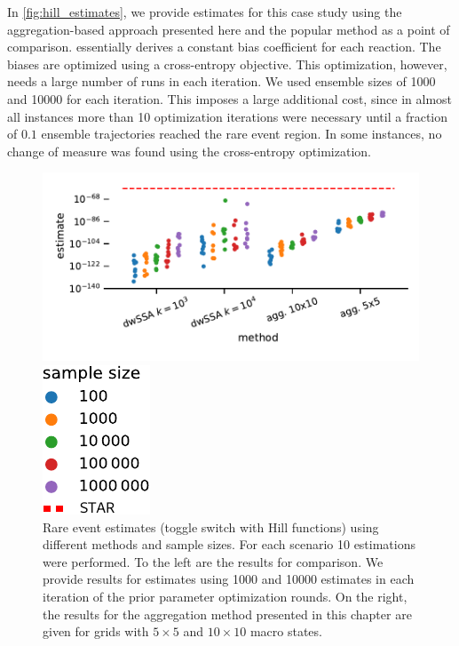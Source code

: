 In \autoref{fig:hill_estimates}, we provide estimates for this case
study using the aggregation-based approach presented here and the
popular  method as a point of comparison.
 \parencite{daigle2011automated} essentially derives a
constant bias coefficient for each reaction.
The biases are optimized using a cross-entropy objective.
This optimization, however, needs a large number of runs in each iteration.
We used ensemble sizes of \num{1000} and \num{10000} for each iteration.
This imposes a large additional cost, since in almost all instances
more than \num{10} optimization iterations were necessary until a
fraction of $0.1$ ensemble trajectories reached the rare event region.
In some instances, no change of measure was found using the
cross-entropy optimization.
\begin{figure}[htb]
  \centering
  \begin{minipage}{0.77\textwidth}
    \includegraphics[scale=.55]{gfx/hill_estimates.pdf}
  \end{minipage}
  \hspace{1ex}
  \begin{minipage}{0.07\textwidth}
    \includegraphics[scale=.55]{gfx/hill_estimates_legend.pdf}
  \end{minipage}
  \caption[Rare event estimates (toggle
  switch)]{\label{fig:hill_estimates}Rare event estimates (toggle
    switch with Hill functions) using different methods and sample
    sizes. For each scenario \num{10} estimations were performed. To
    the left are the  results for comparison. We provide
    results for estimates using \num{1000} and \num{10000} estimates in
    each iteration of the prior parameter optimization rounds. On the
    right, the results for the aggregation method presented in this
  chapter are given for grids with $5\times 5$ and $10\times 10$ macro states.}
\end{figure}

